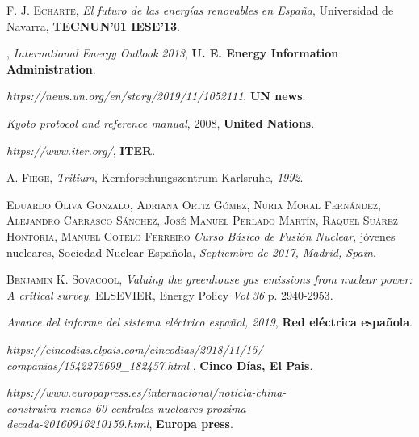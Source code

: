 \begin{thebibliography}{100}
 \textsc{F. J. Echarte},
\textit{El futuro de las energías renovables en España}, Universidad de Navarra, \textbf{TECNUN'01 IESE'13}.

,
\textit{International Energy Outlook 2013},  \textbf{U. E. Energy Information Administration}.

\textit{https://news.un.org/en/story/2019/11/1052111}, \textbf{UN news}.

\textit{Kyoto protocol and reference manual}, 2008, \textbf{United Nations}.

\textit{https://www.iter.org/}, \textbf{ITER}.

 \textsc{A. Fiege}, 
\textit{Tritium}, Kernforschungszentrum Karlsruhe, \textit{1992}.

 \textsc{Eduardo Oliva Gonzalo}, \textsc{Adriana Ortiz Gómez}, \textsc{Nuria Moral Fernández}, \textsc{Alejandro Carrasco Sánchez}, \textsc{José Manuel Perlado Martín}, \textsc{Raquel Suárez Hontoria}, \textsc{Manuel Cotelo Ferreiro} 
\textit{Curso Básico de Fusión Nuclear}, jóvenes nucleares, Sociedad Nuclear Española, \textit{Septiembre de 2017, Madrid, Spain}.

 \textsc{Benjamin K. Sovacool}, 
\textit{Valuing the greenhouse gas emissions from nuclear power: A critical survey}, 
ELSEVIER, Energy Policy  \textit{Vol 36} p. 2940-2953.

\textit{Avance del informe del sistema eléctrico español, 2019}, 
\textbf{Red eléctrica española}.

\textit{https://cincodias.elpais.com/cincodias/2018/11/15/\\
companias/1542275699\_182457.html
}, \textbf{Cinco Días, El Pais}.

\textit{https://www.europapress.es/internacional/noticia-china-\\
construira-menos-60-centrales-nucleares-proxima-\\
decada-20160916210159.html}, 
\textbf{Europa press}.


\end{thebibliography}
